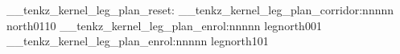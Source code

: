 \documentclass{standalone}
\begin{document}
\ExplSyntaxOn
\__tenkz_kernel_leg_plan_reset:
\__tenkz_kernel_leg_plan_corridor:nnnnn {north}{0}{1}{1}{0}
\__tenkz_kernel_leg_plan_enrol:nnnnn {leg}{north}{0}{0}{1}
\__tenkz_kernel_leg_plan_enrol:nnnnn {leg}{north}{1}{0}{1}
\ExplSyntaxOff
\end{document}
